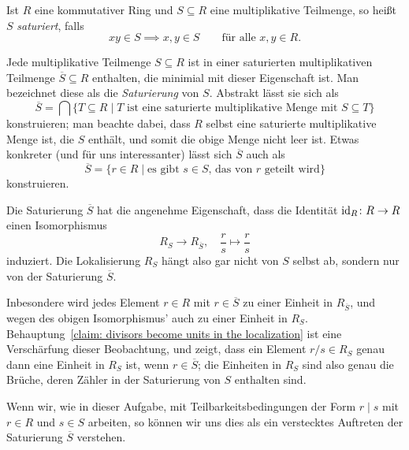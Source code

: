 \documentclass[a4paper,10pt,numbers=noenddot]{scrartcl}
\begin{document}
\begin{remark}
  Ist $R$ eine kommutativer Ring und $S \subseteq R$ eine multiplikative Teilmenge, so heißt $S$ \emph{saturiert}, falls
  \[
    x y \in S \implies x, y \in S
    \qquad
    \text{für alle $x, y \in R$}.
  \]
  
  Jede multiplikative Teilmenge $S \subseteq R$ ist in einer saturierten multiplikativen Teilmenge $\overline{S} \subseteq R$ enthalten, die minimial mit dieser Eigenschaft ist.
  Man bezeichnet diese als die \emph{Saturierung} von $S$.
  Abstrakt lässt sie sich als
  \[
      \overline{S}
    = \bigcap \{
                T \subseteq R
              \mid
                \text{$T$ ist eine saturierte multiplikative Menge mit $S \subseteq T$}
              \}
  \]
  konstruieren; man beachte dabei, dass $R$ selbst eine saturierte multiplikative Menge ist, die $S$ enthält, und somit die obige Menge nicht leer ist.
  Etwas konkreter (und für uns interessanter) lässt sich $\overline{S}$ auch als
  \[
      \overline{S}
    = \{
        r \in R
        \mid
        \text{es gibt $s \in S$, das von $r$ geteilt wird}
      \}
  \]
  konstruieren.
  
  Die Saturierung $\overline{S}$ hat die angenehme Eigenschaft, dass die Identität $\operatorname{id}_R \colon R \to R$ einen Isomorphismus
  \[
    R_S \to R_{\overline{S}},
    \quad
    \frac{r}{s} \mapsto \frac{r}{s}
  \]
  induziert.
  Die Lokalisierung $R_S$ hängt also gar nicht von $S$ selbst ab, sondern nur von der Saturierung $\overline{S}$.
  
  Inbesondere wird jedes Element $r \in R$ mit $r \in \overline{S}$ zu einer Einheit in $R_{\overline{S}}$, und wegen des obigen Isomorphismus’ auch zu einer Einheit in $R_S$.
  Behauptung~\ref{claim: divisors become units in the localization} ist eine Verschärfung dieser Beobachtung, und zeigt, dass ein Element $r/s \in R_S$ genau dann eine Einheit in $R_S$ ist, wenn $r \in \overline{S}$; die Einheiten in $R_S$ sind also genau die Brüche, deren Zähler in der Saturierung von $S$ enthalten sind.
  
  Wenn wir, wie in dieser Aufgabe, mit Teilbarkeitsbedingungen der Form $r \mid s$ mit $r \in R$ und $s \in S$ arbeiten, so können wir uns dies als ein verstecktes Auftreten der Saturierung $\overline{S}$ verstehen.
\end{remark}





\subsection{}
\label{subsec: primes become primes in the localization}
\end{document}
